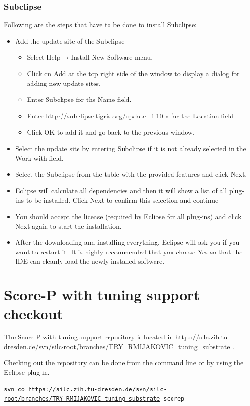 \documentclass[11pt,a4paper, oneside]{book} %
\newcommand{\subclipseurl}{\url{http://subclipse.tigris.org/update_1.10.x} }
\newcommand{\scoreprepo}{\url{https://silc.zih.tu-dresden.de/svn/silc-root/branches/TRY_RMIJAKOVIC_tuning_substrate} }
\newcommand{\eclipseplugin}[3]{
Following are the steps that have to be done to install #1:
 \begin{itemize}
  \item Add the update site of the #1
  \begin{itemize}
   \item Select Help$\rightarrow$Install New Software menu.
   \item Click on Add at the top right side of the window to display a dialog
for adding new update sites.
  \item Enter #1 for the Name field.
  \item Enter #2 for the Location field.
  \item Click OK to add it and go back to the previous window.
  \end{itemize}
  \item Select the update site by entering #1 if it is not already selected in
the Work with field.
  \item Select the #3 from the table with the provided
features and click Next.
  \item Eclipse will calculate all dependencies and then it will show a list of
all plug-ins to be installed. Click Next to confirm this selection and continue.
  \item You should accept the license (required by Eclipse for all plug-ins) and
click Next again to start the installation.
  \item After the downloading and installing everything, Eclipse will ask you if
you want to restart it. It is highly recommended that you choose Yes so that the
IDE can cleanly load the newly installed software.
 \end{itemize}

}
\begin{document}
\subsubsection{Subclipse}

\eclipseplugin{Subclipse}{\subclipseurl}{Subclipse}


\section{Score-P with tuning support checkout}
The Score-P with tuning support repository is located in
\scoreprepo.

Checking out the repository can be done from the command line or by using the Eclipse plug-in.

\texttt{svn co \scoreprepo scorep}
\end{document}
